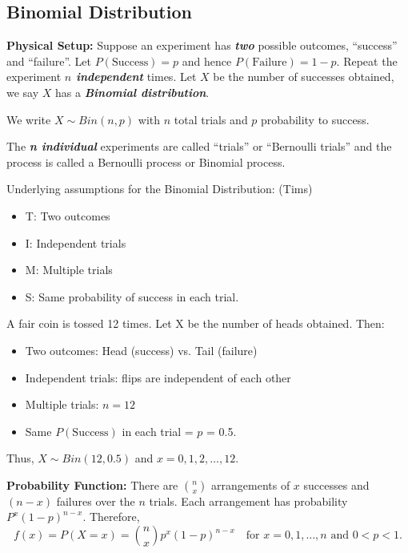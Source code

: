\subsection{Binomial Distribution}

\textbf{Physical Setup:} Suppose an experiment has \textbf{\textit{two}} possible outcomes, ``success'' and ``failure''.
Let $P(\text{Success}) = p$ and hence $P(\text{Failure}) = 1-p$. Repeat the experiment \textbf{\textit{$n$ independent}} times.
Let $X$ be the number of successes obtained, we say $X$ has a \textbf{\textit{Binomial distribution}}.


We write \( X \sim Bin(n, p) \) with $n$ total trials and $p$ probability to success.

\begin{note}
    The \textbf{\textit{n individual}} experiments are called “trials” or “Bernoulli trials” and the process is
    called a Bernoulli process or Binomial process. \\
\end{note}


Underlying assumptions for the Binomial Distribution: (Tims)
\begin{itemize}
    \item T: Two outcomes
    \item I: Independent trials
    \item M: Multiple trials
    \item S: Same probability of success in each trial.
\end{itemize}

\begin{example}
    A fair coin is tossed 12 times. Let X be the number of heads obtained. Then:
    \begin{itemize}
        \item Two outcomes: Head (success) vs. Tail (failure)
        \item Independent trials: flips are independent of each other
        \item Multiple trials: $n = 12$
        \item Same $P(\text{Success})$ in each trial = $p$ = 0.5.
    \end{itemize}
    Thus, $X \sim Bin(12, 0.5)$ and $x = 0,1,2, \ldots ,12$. \\
\end{example}

\textbf{Probability Function:} There are $\binom{n}{x}$ arrangements of $x$ successes and $(n-x)$ failures over the $n$ trials.
Each arrangement has probability $P^x(1-p)^{n-x}$. Therefore,
\[f(x) = P(X=x) = \binom{n}{x}p^x(1-p)^{n-x} \quad \text{for $x = 0,1,\ldots ,n$ and $0 < p < 1$}.\]

